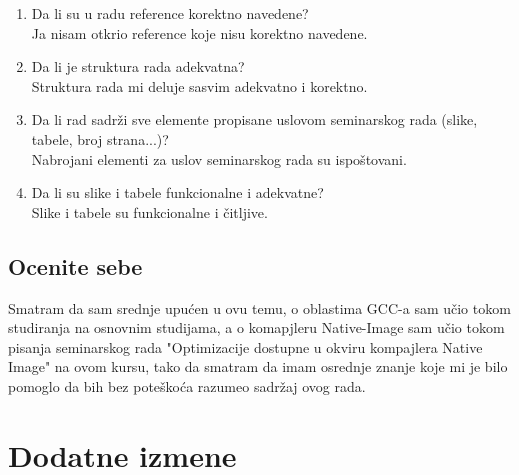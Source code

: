 \documentclass[a4paper]{report}
\begin{document}
\begin{enumerate}
\item Da li su u radu reference korektno navedene?\\
Ja nisam otkrio reference koje nisu korektno navedene.

\item Da li je struktura rada adekvatna?\\
Struktura rada mi deluje sasvim adekvatno i korektno.

\item Da li rad sadrži sve elemente propisane uslovom seminarskog rada (slike, tabele, broj strana...)?\\
Nabrojani elementi za uslov seminarskog rada su ispoštovani.

\item Da li su slike i tabele funkcionalne i adekvatne?\\
Slike i tabele su funkcionalne i čitljive.

\end{enumerate}

\section{Ocenite sebe}
Smatram da sam srednje upućen u ovu temu, o oblastima GCC-a sam učio tokom studiranja na osnovnim studijama, a o komapjleru Native-Image sam učio tokom pisanja seminarskog rada "Optimizacije dostupne u okviru kompajlera
Native Image" na ovom kursu, tako da smatram da imam osrednje znanje koje mi je bilo pomoglo da bih bez poteškoća razumeo sadržaj ovog rada.


\chapter{Dodatne izmene}
\end{document}
